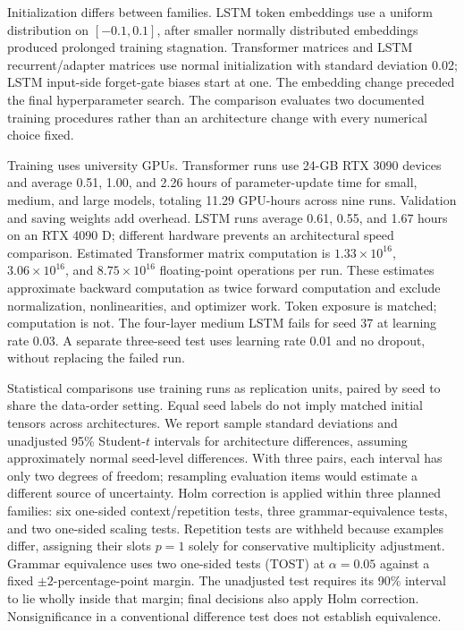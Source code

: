 \documentclass[10pt]{article}
\begin{document}
Initialization differs between families. LSTM token embeddings use a uniform distribution on $[-0.1,0.1]$, after smaller normally distributed embeddings produced prolonged training stagnation. Transformer matrices and LSTM recurrent/adapter matrices use normal initialization with standard deviation 0.02; LSTM input-side forget-gate biases start at one. The embedding change preceded the final hyperparameter search. The comparison evaluates two documented training procedures rather than an architecture change with every numerical choice fixed.

Training uses university GPUs. Transformer runs use 24-GB RTX 3090 devices and average 0.51, 1.00, and 2.26 hours of parameter-update time for small, medium, and large models, totaling 11.29 GPU-hours across nine runs. Validation and saving weights add overhead. LSTM runs average 0.61, 0.55, and 1.67 hours on an RTX 4090 D; different hardware prevents an architectural speed comparison. Estimated Transformer matrix computation is $1.33\times10^{16}$, $3.06\times10^{16}$, and $8.75\times10^{16}$ floating-point operations per run. These estimates approximate backward computation as twice forward computation and exclude normalization, nonlinearities, and optimizer work. Token exposure is matched; computation is not. The four-layer medium LSTM fails for seed 37 at learning rate 0.03. A separate three-seed test uses learning rate 0.01 and no dropout, without replacing the failed run.

Statistical comparisons use training runs as replication units, paired by seed to share the data-order setting. Equal seed labels do not imply matched initial tensors across architectures. We report sample standard deviations and unadjusted 95\% Student-$t$ intervals for architecture differences, assuming approximately normal seed-level differences. With three pairs, each interval has only two degrees of freedom; resampling evaluation items would estimate a different source of uncertainty. Holm correction is applied within three planned families: six one-sided context/repetition tests, three grammar-equivalence tests, and two one-sided scaling tests. Repetition tests are withheld because examples differ, assigning their slots $p=1$ solely for conservative multiplicity adjustment. Grammar equivalence uses two one-sided tests (TOST) at $\alpha=0.05$ against a fixed $\pm2$-percentage-point margin. The unadjusted test requires its 90\% interval to lie wholly inside that margin; final decisions also apply Holm correction. Nonsignificance in a conventional difference test does not establish equivalence.
\end{document}
